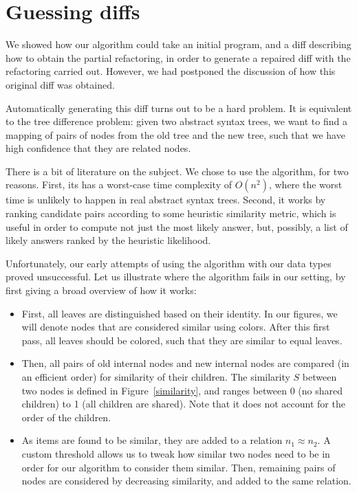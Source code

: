 \section{Guessing diffs}\label{chick-guess}

We showed how our algorithm could take an initial program, and a diff describing
how to obtain the partial refactoring, in order to generate a repaired diff with
the refactoring carried out.  However, we had postponed the discussion of how
this original diff was obtained.

Automatically generating this diff turns out to be a hard problem.  It is
equivalent to the tree difference problem: given two abstract syntax trees, we
want to find a mapping of pairs of nodes from the old tree and the new tree,
such that we have high confidence that they are related nodes.

There is a bit of literature on the subject.  We chose to use the
 algorithm, for two reasons.  First, its has a worst-case time
complexity of $O(n^{2})$, where the worst time is unlikely to happen in real
abstract syntax trees.  Second, it works by ranking candidate pairs according to
some heuristic similarity metric, which is useful in order to compute not just
the most likely answer, but, possibly, a list of likely answers ranked by the
heuristic likelihood.

Unfortunately, our early attempts of using the algorithm with our data types
proved unsuccessful.  Let us illustrate where the algorithm fails in our
setting, by first giving a broad overview of how it works:

\begin{itemize}

  \item First, all leaves are distinguished based on their identity.  In our
figures, we will denote nodes that are considered similar using colors.  After
this first pass, all leaves should be colored, such that they are similar to
equal leaves.

  \item Then, all pairs of old internal nodes and new internal nodes are
compared (in an efficient order) for similarity of their children.  The
similarity $S$ between two nodes is defined in Figure~\ref{similarity}, and
ranges between 0 (no shared children) to 1 (all children are shared).  Note that
it does not account for the order of the children.

  \item As items are found to be similar, they are added to a relation $n_{1}
\approx n_{2}$.  A custom threshold allows us to tweak how similar two nodes
need to be in order for our algorithm to consider them similar.  Then, remaining
pairs of nodes are considered by decreasing similarity, and added to the same
relation.

\end{itemize}

